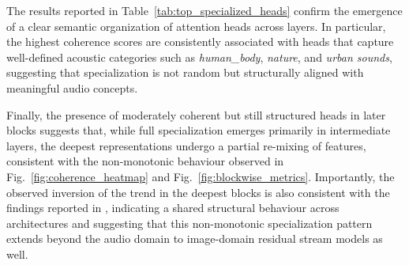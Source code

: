 The results reported in Table~\ref{tab:top_specialized_heads} confirm the emergence of a
clear semantic organization of attention heads across layers. In particular, the highest
coherence scores are consistently associated with heads that capture well-defined acoustic
categories such as \textit{human\_body}, \textit{nature}, and \textit{urban sounds},
suggesting that specialization is not random but structurally aligned with meaningful
audio concepts.
 
Finally, the presence of moderately coherent but still structured heads in later blocks
suggests that, while full specialization emerges primarily in intermediate layers, the
deepest representations undergo a partial re-mixing of features, consistent with the
non-monotonic behaviour observed in Fig.~\ref{fig:coherence_heatmap} and
Fig.~\ref{fig:blockwise_metrics}. Importantly, the observed inversion of the trend in the
deepest blocks is also consistent with the findings reported in \cite{residual2024},
indicating a shared structural behaviour across architectures and suggesting that this
non-monotonic specialization pattern extends beyond the audio domain to image-domain
residual stream models as well.
